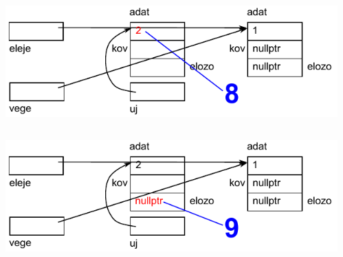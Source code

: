 \begin{frame}
  \begin{columns}[c]
      \scriptsize
      \begin{exampleblock}{}
        \vspace{-.2cm}
        
        \vspace{-.2cm}
      \end{exampleblock}
      \includegraphics[width=\textwidth]{sor/sor09.pdf}
  \end{columns}
\end{frame}

\begin{frame}
  \begin{columns}[c]
      \scriptsize
      \begin{exampleblock}{}
        \vspace{-.2cm}
        
        \vspace{-.2cm}
      \end{exampleblock}
      \includegraphics[width=\textwidth]{sor/sor10.pdf}
  \end{columns}
\end{frame}

